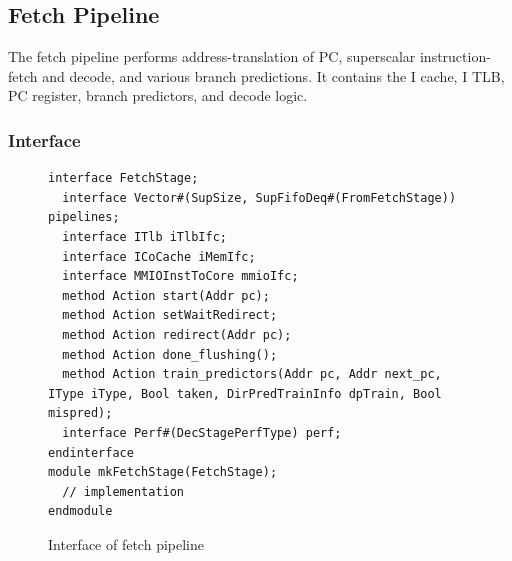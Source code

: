 \subsection{Fetch Pipeline}

The fetch pipeline performs address-translation of PC, superscalar instruction-fetch and decode, and various branch predictions.
It contains the I cache, I TLB, PC register, branch predictors, and decode logic.

\subsubsection{Interface}

\begin{figure}
\begin{lstlisting}[caption={}]
interface FetchStage;
  interface Vector#(SupSize, SupFifoDeq#(FromFetchStage)) pipelines;
  interface ITlb iTlbIfc;
  interface ICoCache iMemIfc;
  interface MMIOInstToCore mmioIfc;
  method Action start(Addr pc);
  method Action setWaitRedirect;
  method Action redirect(Addr pc);
  method Action done_flushing();
  method Action train_predictors(Addr pc, Addr next_pc, IType iType, Bool taken, DirPredTrainInfo dpTrain, Bool mispred);
  interface Perf#(DecStagePerfType) perf;
endinterface
module mkFetchStage(FetchStage);
  // implementation
endmodule
\end{lstlisting}
\caption{Interface of fetch pipeline}\label{fig:fetch-fic}
\end{figure}

